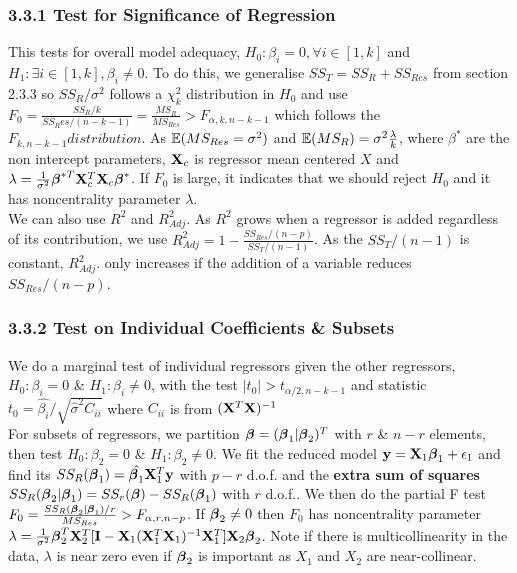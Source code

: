 \begin{multicols*}{3}
\subsubsection{3.3.1 Test for Significance of Regression}
This tests for overall model adequacy, $H_0: \beta_i = 0, \forall i \in [1, k]$ and $H_1: \exists i \in [1, k], \beta_i \neq 0$. To do this, we generalise $SS_T = SS_R + SS_{Res}$ from section 2.3.3 so $SS_R/\sigma^2$ follows a $\chi_k^2$ distribution in $H_0$ and use $F_0 = \frac{SS_R/k}{SS_Res/(n - k - 1)} = \frac{MS_R}{MS_{Res}} > F_{\alpha,k,n-k-1}$ which follows the $F_{k,n-k-1} distribution$. As $\mathbb{E}(MS_{Res} = \sigma^2)$ and $\mathbb{E}(MS_R) = \sigma^2\frac{\lambda}{k}$, where $\beta^*$ are the non intercept parameters, $\mathbf{X}_c$ is regressor mean centered $X$ and $\lambda = \frac{1}{\sigma^2}\boldsymbol{\beta}^{*T}\mathbf{X}_c^T\mathbf{X}_c\boldsymbol{\beta}^*$. If $F_0$ is large, it indicates that we should reject $H_0$ and it has noncentrality parameter $\lambda$. \\
We can also use $R^2$ and $R_{Adj}^2$. As $R^2$ grows when a regressor is added regardless of its contribution, we use $R_{Adj}^2 = 1 - \frac{SS_{Res}/(n-p)}{SS_T/(n-1)}$. As the $SS_T/(n-1)$ is constant, $R_{Adj}^2$. only increases if the addition of a variable reduces $SS_{Res}/(n-p)$.

\subsubsection{3.3.2 Test on Individual Coefficients \& Subsets}
We do a marginal test of individual regressors given the other regressors, $H_0: \beta_i = 0$ \& $H_1: \beta_i \neq 0$, with the test $|t_0| > t_{\alpha/2,n-k-1}$ and statistic $t_0 = \hat{\beta_i} / \sqrt{\hat{\sigma}^2 C_{ii}}$ where $C_{ii}$ is from $(\mathbf{X}^T\mathbf{X})^{-1}$ \\
For subsets of regressors, we partition $\boldsymbol{\beta} = (\boldsymbol{\beta}_1 | \boldsymbol{\beta}_2)^T$ with $r$ \& $n - r$ elements, then test $H_0: \beta_2 = 0$ \& $H_1: \beta_2 \neq 0$. We fit the reduced model $\mathbf{y} = \mathbf{X}_1\boldsymbol{\beta}_1 + \epsilon_1$ and find its $SS_R(\boldsymbol{\beta}_1) = \hat{\boldsymbol{\beta}_1}\mathbf{X}_1^T\mathbf{y}$ with $p - r$ d.o.f. and the \textbf{extra sum of squares} $SS_R(\boldsymbol{\beta}_2 | \boldsymbol{\beta}_1) = SS_r(\boldsymbol{\beta}) - SS_R(\boldsymbol{\beta}_1)$ with $r$ d.o.f.. We then do the partial F test $F_0 = \frac{SS_R(\boldsymbol{\beta}_2 | \boldsymbol{\beta}_1) / r}{MS_{Res}} > F_{\alpha,r,n-p}$. If $\boldsymbol{\beta}_2 \neq 0$ then $F_0$ has noncentrality parameter $\lambda = \frac{1}{\sigma^2}\boldsymbol{\beta}_2^T\mathbf{X}_2^T[\mathbf{I} - \mathbf{X}_1(\mathbf{X}_1^T\mathbf{X}_1)^{-1}\mathbf{X}_1^T]\mathbf{X}_2\boldsymbol{\beta}_2$. Note if there is multicollinearity in the data, $\lambda$ is near zero even if $\boldsymbol{\beta}_2$ is important as $X_1$ and $X_2$ are near-collinear.


\end{multicols*}
